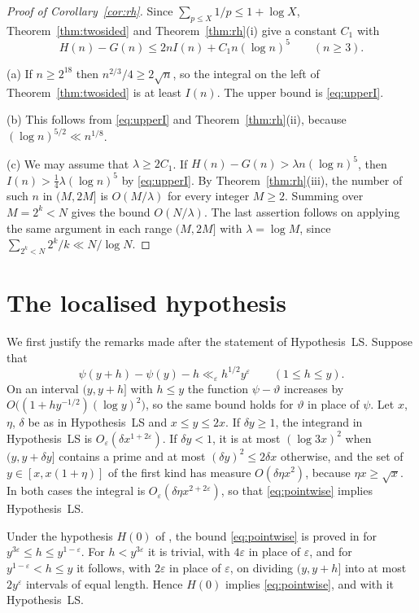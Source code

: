 \documentclass[11pt,reqno]{amsart}
\theoremstyle{definition}
\theoremstyle{remark}
\numberwithin{equation}{section}
\newcommand{\eps}{\varepsilon}
\begin{document}
\begin{proof}[Proof of Corollary~\ref{cor:rh}]
Since $\sum_{p\le X}1/p\le1+\log X$, Theorem~\ref{thm:twosided} and Theorem~\ref{thm:rh}(i) give a constant $C_1$ with
\begin{equation}\label{eq:upperI}
 H(n)-G(n)\le2nI(n)+C_1n(\log n)^5\qquad(n\ge3).
\end{equation}

(a) If $n\ge2^{18}$ then $n^{2/3}/4\ge2\sqrt n$, so the integral on the left of Theorem~\ref{thm:twosided} is at least $I(n)$. The upper bound is \eqref{eq:upperI}.

(b) This follows from \eqref{eq:upperI} and Theorem~\ref{thm:rh}(ii), because $(\log n)^{5/2}\ll n^{1/8}$.

(c) We may assume that $\lambda\ge2C_1$. If $H(n)-G(n)>\lambda n(\log n)^5$, then $I(n)>\frac14\lambda(\log n)^5$ by \eqref{eq:upperI}. By Theorem~\ref{thm:rh}(iii), the number of such $n$ in $(M,2M]$ is $O(M/\lambda)$ for every integer $M\ge2$. Summing over $M=2^k<N$ gives the bound $O(N/\lambda)$. The last assertion follows on applying the same argument in each range $(M,2M]$ with $\lambda=\log M$, since $\sum_{2^k<N}2^k/k\ll N/\log N$.
\end{proof}

\section{The localised hypothesis}\label{sec:ls}

We first justify the remarks made after the statement of Hypothesis~LS. Suppose that
\begin{equation}\label{eq:pointwise}
 \psi(y+h)-\psi(y)-h\ll_\eps h^{1/2}y^\eps\qquad(1\le h\le y).
\end{equation}
On an interval $(y,y+h]$ with $h\le y$ the function $\psi-\vartheta$ increases by $O\bigl((1+hy^{-1/2})(\log y)^2\bigr)$, so the same bound holds for $\vartheta$ in place of $\psi$. Let $x$, $\eta$, $\delta$ be as in Hypothesis~LS and $x\le y\le2x$. If $\delta y\ge1$, the integrand in Hypothesis~LS is $O_\eps(\delta x^{1+2\eps})$. If $\delta y<1$, it is at most $(\log3x)^2$ when $(y,y+\delta y]$ contains a prime and at most $(\delta y)^2\le2\delta x$ otherwise, and the set of $y\in[x,x(1+\eta)]$ of the first kind has measure $O(\delta\eta x^2)$, because $\eta x\ge\sqrt x$. In both cases the integral is $O_\eps(\delta\eta x^{2+2\eps})$, so that \eqref{eq:pointwise} implies Hypothesis~LS.

Under the hypothesis $H(0)$ of \cite{LPZ}, the bound \eqref{eq:pointwise} is proved in \cite[Theorem~2]{LPZ} for $y^{3\eps}\le h\le y^{1-\eps}$. For $h<y^{3\eps}$ it is trivial, with $4\eps$ in place of $\eps$, and for $y^{1-\eps}<h\le y$ it follows, with $2\eps$ in place of $\eps$, on dividing $(y,y+h]$ into at most $2y^\eps$ intervals of equal length. Hence $H(0)$ implies \eqref{eq:pointwise}, and with it Hypothesis~LS.
\end{document}
